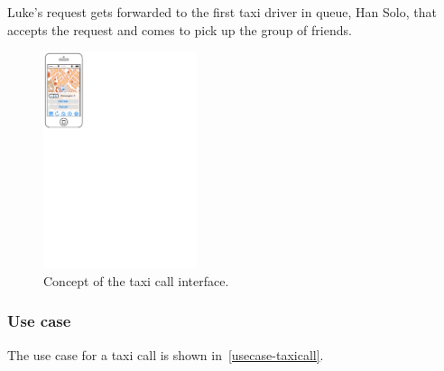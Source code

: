 Luke's request gets forwarded to the first taxi driver in queue, Han Solo, that accepts the request and comes to pick up the group of friends.

\begin{figure}
\begin{center}
\includegraphics[width=0.4\textwidth]{mockup/TaxiCall.pdf}
\caption{Concept of the taxi call interface.}
\label{fig:mockup-taxicall}
\end{center}
\end{figure}

\subsubsection{Use case}
The use case for a taxi call is shown in~\autoref{usecase-taxicall}.

